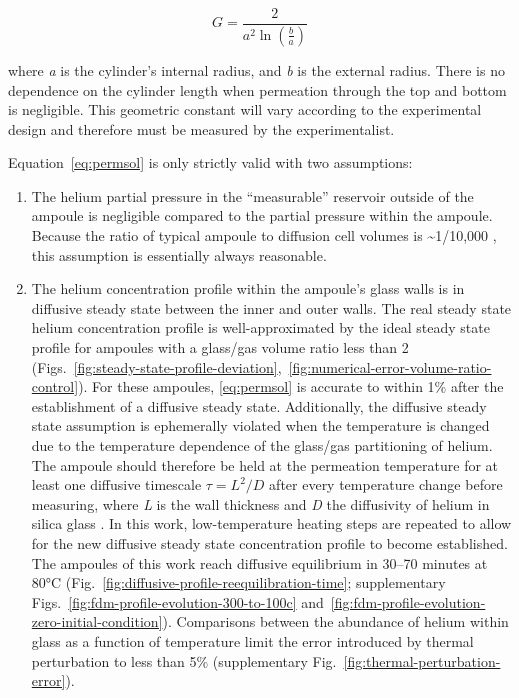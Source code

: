 \begin{equation}
\label{eq:geomfactor}
G = \frac{2}{a^{2}\ln\left( \frac{b}{a} \right)}
\end{equation}

where \emph{a} is the cylinder's internal radius, and \emph{b} is the external radius. There is no dependence on the cylinder length when permeation through the top and bottom is negligible. This geometric constant will vary according to the experimental design and therefore must be measured by the experimentalist.

Equation~\eqref{eq:permsol} is only strictly valid with two assumptions:

\begin{enumerate}
\def\labelenumi{\arabic{enumi}.}
\item
  The helium partial pressure in the ``measurable'' reservoir outside of the ampoule is negligible compared to the partial pressure within the ampoule. Because the ratio of typical ampoule to diffusion cell volumes is \textasciitilde1/10,000 \citep{farley1999}, this assumption is essentially always reasonable.
\item
  The helium concentration profile within the ampoule's glass walls is in diffusive steady state between the inner and outer walls. The real steady state helium concentration profile is well-approximated by the ideal steady state profile for ampoules with a glass/gas volume ratio less than 2 (Figs.~\ref{fig:steady-state-profile-deviation},~\ref{fig:numerical-error-volume-ratio-control}). For these ampoules, \eqref{eq:permsol} is accurate to within 1\% after the establishment of a diffusive steady state. Additionally, the diffusive steady state assumption is ephemerally violated when the temperature is changed due to the temperature dependence of the glass/gas partitioning of helium. The ampoule should therefore be held at the permeation temperature for at least one diffusive timescale \(\tau = L^{2}/D\) after every temperature change before measuring, where \emph{L} is the wall thickness and \emph{D} the diffusivity of helium in silica glass \citep{swets1961}. In this work, low-temperature heating steps are repeated to allow for the new diffusive steady state concentration profile to become established. The ampoules of this work reach diffusive equilibrium in 30--70 minutes at 80°C (Fig.~\ref{fig:diffusive-profile-reequilibration-time}; supplementary Figs.~\ref{fig:fdm-profile-evolution-300-to-100c} and~\ref{fig:fdm-profile-evolution-zero-initial-condition}). Comparisons between the abundance of helium within glass as a function of temperature limit the error introduced by thermal perturbation to less than 5\% (supplementary Fig.~\ref{fig:thermal-perturbation-error}).
\end{enumerate}

